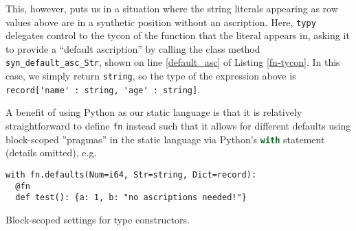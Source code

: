 \documentclass[preprint,10pt]{sigplanconf}
\newcommand{\lip}[1]{\lstinline[language=Python,basicstyle=\ttfamily\small,deletendkeywords={tuple,buffer,map}]{#1}}
\begin{document}
This, however, puts us in a situation where the string literals appearing as row values above are in a synthetic position without an ascription. Here, \lip{typy} delegates control to the tycon of the function that the literal appears in, asking it to provide a ``default ascription'' by calling the class method \lip{syn_default_asc_Str}, shown on line \ref{default_asc} of Listing \ref{fn-tycon}. In this case, we simply return \lip{string}, so the type of the expression above is \lstinline[basicstyle=\ttfamily\small]{record['name' : string, 'age' : string]}. 

A benefit of using Python as our static language is that it is relatively straightforward to define \lip{fn} instead such that it allows for different defaults using block-scoped ''pragmas'' in the static language via Python's \lip{with} statement \cite{python} (details omitted), e.g. 
\begin{codelisting}[h]
\begin{lstlisting}[numbers=none]
with fn.defaults(Num=i64, Str=string, Dict=record):
  @fn
  def test(): {a: 1, b: "no ascriptions needed!"} 
\end{lstlisting}
\caption{Block-scoped settings for type constructors.}
\label{defaultasc}
\end{codelisting}
\vspace{-10px}

\end{document}
